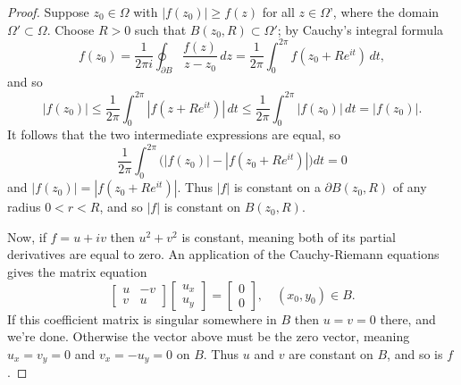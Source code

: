\documentclass[../m136main.tex]{subfiles}
\begin{document}
\begin{proof}
    Suppose $z_0 \in \Omega$ with $|f(z_0)| \geq f(z)$ for all $z \in \Omega$', where the domain $\Omega' \subset \Omega$.
    Choose $R > 0$ such that $B(z_0, R) \subset \Omega'$; by Cauchy's integral formula
    \[ f(z_0) = \frac{1}{2\pi i} \oint_{\partial B} \frac{f(z)}{z - z_0} \,dz = \frac{1}{2\pi} \int_{0}^{2\pi} f(z_0 + Re^{it}) \,dt, \]
    and so
    \[ |f(z_0)| \leq \frac{1}{2\pi} \int_{0}^{2\pi} |f(z + Re^{it})| \,dt \leq \frac{1}{2\pi} \int_{0}^{2\pi} |f(z_0)| \,dt = |f(z_0)|. \]
    It follows that the two intermediate expressions are equal, so
    \[ \frac{1}{2\pi} \int_{0}^{2\pi} \Big( |f(z_0)| - |f(z_0 + Re^{it})| \Big) dt = 0 \]
    and $|f(z_0)| = |f(z_0 + Re^{it})|$.
    Thus $|f|$ is constant on a $\partial B(z_0, R)$ of any radius $0 < r < R$, and so $|f|$ is constant on $B(z_0, R)$.

    Now, if $f = u + iv$ then $u^2 + v^2$ is constant, meaning both of its partial derivatives are equal to zero.
    An application of the Cauchy-Riemann equations gives the matrix equation
    \[ \begin{bmatrix} u & -v \\ v & u \end{bmatrix} \begin{bmatrix} u_x \\ u_y \end{bmatrix} = \begin{bmatrix} 0 \\ 0 \end{bmatrix}, \quad (x_0, y_0) \in B. \]
    If this coefficient matrix is singular somewhere in $B$ then $u = v = 0$ there, and we're done.
    Otherwise the vector above must be the zero vector, meaning $u_x = v_y = 0$ and $v_x = -u_y = 0$ on $B$.
    Thus $u$ and $v$ are constant on $B$, and so is $f$.
\end{proof}
\end{document}
